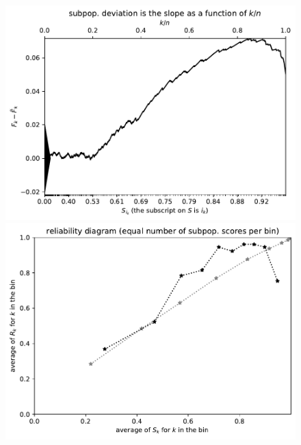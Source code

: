 \documentclass{article}
\begin{document}
\begin{figure}
\begin{centering}

\parbox{\imsize}{\includegraphics[width=\imsize]
       {./codes/unweighted/prob-1-342-wild-boar-boar-Sus-scrofa}}
\quad\quad
\parbox{\imsize}{\includegraphics[width=\imsize]
       {./codes/unweighted/prob-1-342-wild-boar-boar-Sus-scrofaequisamps10}}

\vspace{\vertsep}


\end{centering}
\end{figure}
\end{document}

